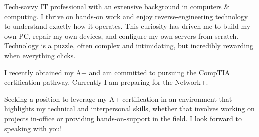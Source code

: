 
\begin{cvparagraph}
Tech-savvy IT professional with an extensive background in computers \& computing. I thrive on hands-on work and enjoy reverse-engineering technology to understand exactly how it operates. This curiosity has driven me to build my own PC, repair my own devices, and configure my own servers from scratch. Technology is a puzzle, often complex and intimidating, but incredibly rewarding when everything clicks.

I recently obtained my A+ and am committed to pursuing the CompTIA certification pathway. Currently I am preparing for the Network+.

Seeking a position to leverage my A+ certification in an environment that highlights my technical and interpersonal skills, whether that involves working on projects in-office or providing hands-on-support in the field. I look forward to speaking with you!
\end{cvparagraph}
